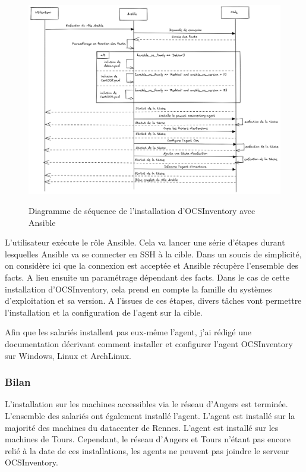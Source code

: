 \documentclass[12pt]{article}
\begin{document}
\begin{figure}[!ht]
    \centering
    \includegraphics[width=\textwidth]{src/Ansible OCS.png}
    \label{fig:ansible_ocs}
    \caption{Diagramme de séquence de l'installation d'OCSInventory avec Ansible}
\end{figure}

L'utilisateur exécute le rôle Ansible.
Cela va lancer une série d'étapes durant lesquelles Ansible va se connecter en SSH à la cible.
Dans un soucis de simplicité, on considère ici que la connexion est acceptée et Ansible récupère l'ensemble des facts.
A lieu ensuite un paramétrage dépendant des facts. 
Dans le cas de cette installation d'OCSInventory, cela prend en compte la famille du systèmes d'exploitation et sa version.
A l'issues de ces étapes, divers tâches vont permettre l'installation et la configuration de l'agent sur la cible.

Afin que les salariés installent pas eux-même l'agent, j'ai rédigé une documentation décrivant comment installer et configurer l'agent OCSInventory sur Windows, Linux et ArchLinux.
\newpage
\subsubsection{Bilan}
L'installation sur les machines accessibles via le réseau d'Angers est terminée.
L'ensemble des salariés ont également installé l'agent.
L'agent est installé sur la majorité des machines du datacenter de Rennes.
L'agent est installé sur les machines de Tours. 
Cependant, le réseau d'Angers et Tours n'étant pas encore relié à la date de ces installations, les agents ne peuvent pas joindre le serveur OCSInventory.
\end{document}
